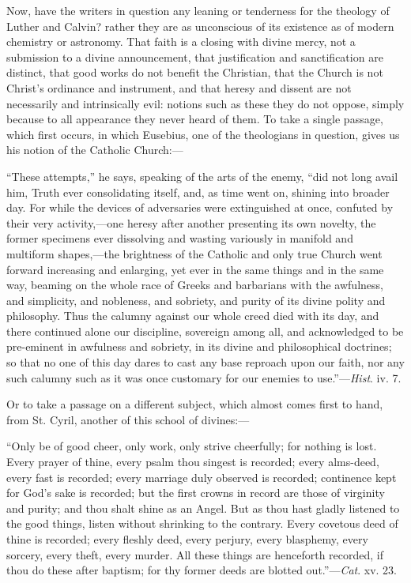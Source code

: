 Now, have the writers in question any leaning or tenderness for the
theology of Luther and Calvin? rather they are as unconscious of its
existence as of modern chemistry or astronomy. That faith is a closing
with divine mercy, not a submission to a divine announcement, that
justification and sanctification are distinct, that good works do not
benefit the Christian, that the Church is not Christ's ordinance and
instrument, and that heresy and dissent are not necessarily and
intrinsically evil: notions such as these they do not oppose, simply
because to all appearance they never heard of them. To take a single
passage, which first occurs, in which Eusebius, one of the theologians
in question, gives us his notion of the Catholic Church:—

``These attempts,'' he says, speaking of the arts of the
enemy, ``did not long avail him, Truth ever consolidating itself,
and, as time went on, shining into broader day. For while the devices
of adversaries were extinguished at once, confuted by their very
activity,—one heresy after another presenting its own novelty, the
former specimens ever dissolving and wasting variously in manifold and
multiform shapes,—the brightness of the Catholic and only true
Church went forward increasing and enlarging, yet ever in the same
things and in the same way, beaming on the whole race of Greeks and
barbarians with the awfulness, and simplicity, and nobleness, and
sobriety, and purity of its divine polity and philosophy. Thus the
calumny against our whole creed died with its day, and there continued
alone our discipline, sovereign among all, and acknowledged to be
pre-eminent in awfulness and sobriety, in its divine and philosophical
doctrines; so that no one of this day dares to cast any base reproach
upon our faith, nor any such calumny such as it was once customary for
our enemies to use.''—\emph{Hist}. iv. 7.

Or to take a passage on a different subject, which almost comes
first to hand, from St. Cyril, another of this school of divines:—

``Only be of good cheer, only work, only strive cheerfully; for
nothing is lost. Every prayer of thine, every psalm thou singest is
recorded; every alms-deed, every fast is recorded; every marriage duly
observed is recorded; continence kept for God's sake is recorded; but
the first crowns in record are those of virginity and purity; and thou
shalt shine as an Angel. But as thou hast gladly listened to the good
things, listen without shrinking to the contrary. Every covetous deed
of thine is recorded; every fleshly deed, every perjury, every
blasphemy, every sorcery, every theft, every murder. All these things
are henceforth recorded, if thou do these after baptism; for thy
former deeds are blotted out.''—\emph{Cat}. xv. 23.

